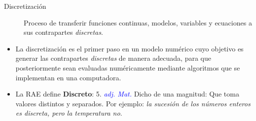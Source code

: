 \documentclass{beamer}
\begin{document}
\begin{frame}

\begin{description}
	\item[Discretización]  Proceso de transferir funciones continuas, modelos, variables y ecuaciones a sus contrapartes \textit{discretas}. 
\end{description}
\begin{itemize}
	\item {\small  La discretización es el primer paso en un modelo numérico cuyo objetivo es generar las contrapartes \textit{discretas} de manera adecuada, para que posteriormente sean evaluadas numéricamente mediante algoritmos que se implementan en una computadora.}
	
	\strut
	
	\item {\small La RAE define \textbf{Discreto}: 5. \textcolor{blue}{\textit{adj. Mat.}} Dicho de una magnitud: Que toma valores distintos y separados. 
		Por ejemplo: \textit{la sucesión de los números enteros es discreta, pero la temperatura no}.}
\end{itemize}
%
\end{frame}
\end{document}
